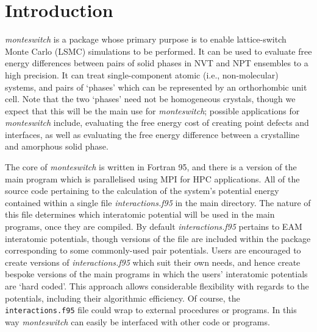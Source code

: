 \documentclass{report}
\begin{document}
\chapter{Introduction}
\emph{monteswitch} is a package whose primary purpose is to enable lattice-switch Monte Carlo (LSMC) \cite{Bruce_1997,Bruce_2000}
simulations to be performed. 
%
It can be used to evaluate free energy differences between pairs of solid phases in NVT and NPT 
ensembles to a high precision. It can treat single-component atomic (i.e., non-molecular) systems, and pairs of `phases' which can be represented
by an orthorhombic unit cell. Note that the two `phases' need not be homogeneous crystals, though we expect that this
will be the main use for \emph{monteswitch}; possible applications for \emph{monteswitch} include, evaluating the free energy cost of creating
point defects and interfaces, as well as evaluating the free energy difference between a crystalline and amorphous solid phase.

The core of \emph{monteswitch} is written in Fortran 95, and there is a version of the main program which is parallelised using MPI 
for HPC applications. All of the source code pertaining to the calculation of the system's potential energy contained within a single file 
\emph{interactions.f95} in the main directory. The nature of this file determines which interatomic potential will be used in the main programs,
once they are compiled. By default \emph{interactions.f95} pertains to EAM interatomic potentials, though versions of the file are included 
within the package corresponding to some commonly-used pair potentials. Users are encouraged to create versions of \emph{interactions.f95} 
which suit their own needs, and hence create bespoke versions of the main programs in which the users' interatomic potentials are `hard coded'.
This approach allows considerable flexibility with regards to the potentials, including their algorithmic efficiency. Of course, the 
\texttt{interactions.f95} file could wrap to external procedures or programs. In this way \emph{monteswitch} can easily be interfaced with 
other code or programs.
\end{document}
